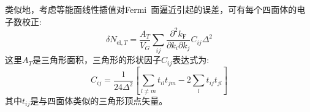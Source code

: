 类似地，考虑等能面线性插值对\textrm{Fermi~}面逼近引起的误差，可有每个四面体的电子数校正:~
\begin{displaymath}
	\delta N_{\mathrm{el},T}=\frac{A_T}{V_G}\sum_{ij}\frac{\partial^2k_{\mathrm F}}{\partial k_i\partial k_j}C_{ij}\Delta^2
\end{displaymath}
这里$A_T$是三角形面积，三角形的形状因子$C_{ij}$表达式为:~
$$C_{ij}=\frac1{24\Delta^2}\left[ \sum_{l\neq m}t_{il}t_{jm}-2\sum_lt_{ij}t_{jl} \right]$$
其中$t_{ij}$是与四面体类似的三角形顶点矢量。%



